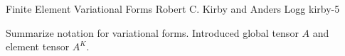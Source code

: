              {Finite Element Variational Forms}
              {Robert C. Kirby and Anders Logg}
              {kirby-5}

Summarize notation for variational forms. Introduced global tensor $A$
and element tensor $A^K$.
